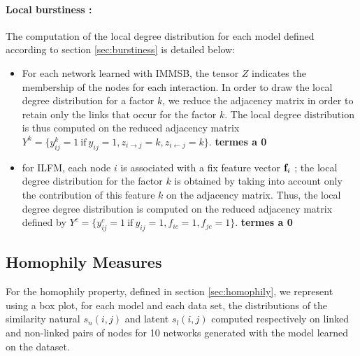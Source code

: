 \paragraph{Local burstiness : }
The computation of the local degree distribution for each model defined according to section \ref{sec:burstiness} is detailed below: 
\begin{itemize}
        \item For each network learned with IMMSB, the tensor $Z$ indicates the membership of the nodes for each  interaction. In order to draw the local degree distribution for a factor $k$, we reduce the adjacency matrix in order to retain only the links that occur for the factor $k$. The local degree distribution is thus computed on the reduced adjacency matrix  $Y^k =\{ y_{ij}^k=1 \ \textrm{if}\ y_{ij}=1 , z_{i\rightarrow j}=k, z_{i\leftarrow j}=k\}$. \textbf{termes a 0}
       \item for ILFM, each node $i$ is associated with a fix feature vector $\mathbf{f}_{i}$ ; the local degree distribution for the factor $k$ is obtained by taking into account only the contribution of this feature $k$ on the adjacency matrix. Thus, the local degree degree distribution is computed on the reduced adjacency matrix defined by $Y^c =\{ y_{ij}^c=1 \ \textrm{if}\ y_{ij}=1 , f_{ic}=1, f_{jc}=1\}$. \textbf{termes a 0}
\end{itemize}

\subsection{Homophily Measures}


For the homophily property, defined in section \ref{sec:homophily}, we represent using a box plot, for each model and each data set, the distributions of the similarity natural $s_n(i,j)$ and latent $s_l(i,j)$ computed respectively on linked and non-linked pairs of nodes for 10 networks generated with the model learned on the dataset.


